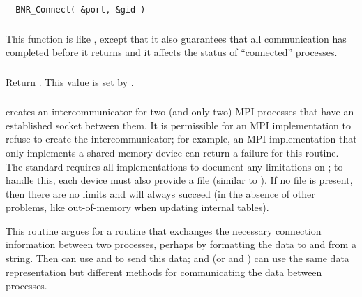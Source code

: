 \documentclass{article}
\begin{document}
\subsubsection{}

\begin{verbatim}
  BNR_Connect( &port, &gid )
\end{verbatim}

\subsubsection{}
This function is like , except that it also guarantees
that all communication has completed before it returns and it affects the
status of ``connected'' processes.



\subsubsection{}
Return .  This value is set by
. 

\subsubsection{}
 creates an intercommunicator for two (and only two)
MPI processes that have an established socket between them.  It is permissible
for an MPI implementation to refuse to create the intercommunicator; for
example, an MPI implementation that only implements a shared-memory device can
return a failure for this routine.  The standard requires all implementations
to document any limitations on ; to handle this, each
device must also provide a file  (similar to
).  If no file is present, then there are no limits
and  will always succeed (in the absence of other
problems, like out-of-memory when updating internal tables).

This routine argues for a routine that exchanges the necessary connection
information between two processes, perhaps by formatting the data to and from
a string.  Then  can use  and 
to send this data;  and 
(or  and ) can use the same data
representation but different methods for communicating the data between
processes.  
\end{document}
